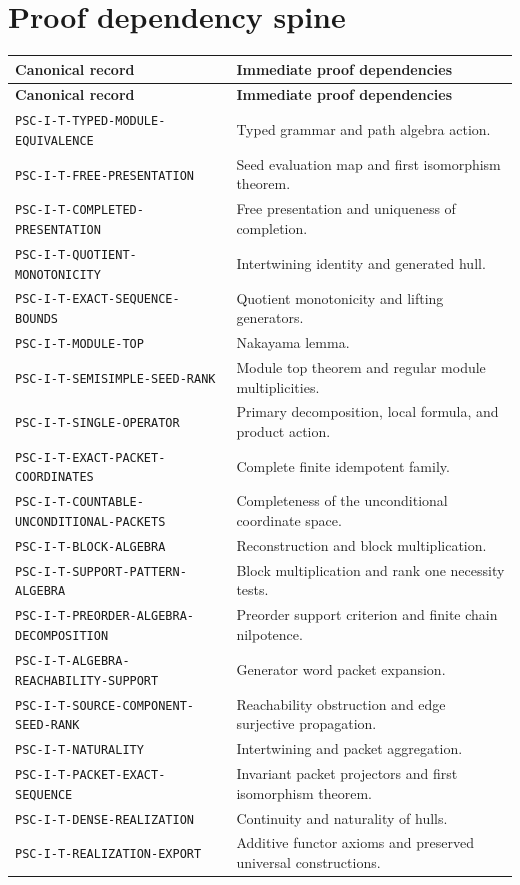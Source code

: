 \section{Proof dependency spine}

\small
\begin{longtable}{@{}p{}p{}@{}}
\toprule
\textbf{Canonical record} & \textbf{Immediate proof dependencies}\\
\midrule
\endfirsthead
\toprule
\textbf{Canonical record} & \textbf{Immediate proof dependencies}\\
\midrule
\endhead
\texttt{PSC-I-T-TYPED-MODULE-EQUIVALENCE} & Typed grammar and path algebra action.\\
\texttt{PSC-I-T-FREE-PRESENTATION} & Seed evaluation map and first isomorphism theorem.\\
\texttt{PSC-I-T-COMPLETED-PRESENTATION} & Free presentation and uniqueness of completion.\\
\texttt{PSC-I-T-QUOTIENT-MONOTONICITY} & Intertwining identity and generated hull.\\
\texttt{PSC-I-T-EXACT-SEQUENCE-BOUNDS} & Quotient monotonicity and lifting generators.\\
\texttt{PSC-I-T-MODULE-TOP} & Nakayama lemma.\\
\texttt{PSC-I-T-SEMISIMPLE-SEED-RANK} & Module top theorem and regular module multiplicities.\\
\texttt{PSC-I-T-SINGLE-OPERATOR} & Primary decomposition, local formula, and product action.\\
\texttt{PSC-I-T-EXACT-PACKET-COORDINATES} & Complete finite idempotent family.\\
\texttt{PSC-I-T-COUNTABLE-}\newline\texttt{UNCONDITIONAL-PACKETS} & Completeness of the unconditional coordinate space.\\
\texttt{PSC-I-T-BLOCK-ALGEBRA} & Reconstruction and block multiplication.\\
\texttt{PSC-I-T-SUPPORT-PATTERN-ALGEBRA} & Block multiplication and rank one necessity tests.\\
\texttt{PSC-I-T-PREORDER-}\newline\texttt{ALGEBRA-DECOMPOSITION} & Preorder support criterion and finite chain nilpotence.\\
\texttt{PSC-I-T-ALGEBRA-}\newline\texttt{REACHABILITY-SUPPORT} & Generator word packet expansion.\\
\texttt{PSC-I-T-SOURCE-COMPONENT-SEED-RANK} & Reachability obstruction and edge surjective propagation.\\
\texttt{PSC-I-T-NATURALITY} & Intertwining and packet aggregation.\\
\texttt{PSC-I-T-PACKET-EXACT-SEQUENCE} & Invariant packet projectors and first isomorphism theorem.\\
\texttt{PSC-I-T-DENSE-REALIZATION} & Continuity and naturality of hulls.\\
\texttt{PSC-I-T-REALIZATION-EXPORT} & Additive functor axioms and preserved universal constructions.\\
\bottomrule
\end{longtable}
\normalsize

